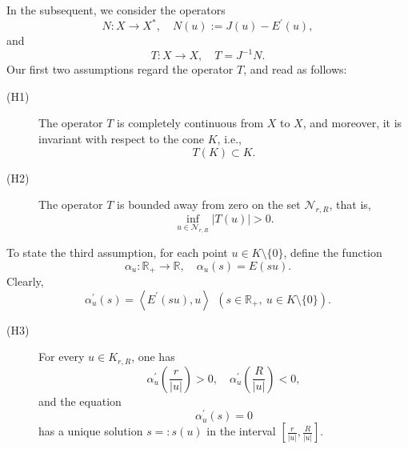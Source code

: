 \documentclass{birkjour}
\theoremstyle{definition}
\theoremstyle{remark}
\numberwithin{equation}{section}
\begin{document}
In the subsequent, we consider the operators
\begin{equation*}
N\colon X\rightarrow X^{\ast },\quad N\left( u\right) :=J\left( u\right)
-E^{\prime }(u),
\end{equation*}%
and
\begin{equation*}
T:X\rightarrow X,\quad T=J^{-1}N.
\end{equation*}%
Our first two assumptions regard the operator $T$, and read as follows:

\begin{description}
\item[(H1)] The operator $T$ is completely continuous from $X$ to $X$, and
moreover, it is invariant with respect to the cone $K$, i.e.,
\begin{equation*}
T(K)\subset K.
\end{equation*}

\item[(H2)] The operator $T$ is bounded away from zero on the set $\mathcal{N%
}_{r,R}$, that is,
\begin{equation*}
\inf_{u\in \mathcal{N}_{r,R}}\left\vert T(u)\right\vert >0.
\end{equation*}
\end{description}

To state the third assumption, for each point $u\in K\setminus \{0\}$,
define the function
\begin{equation}
\alpha _{u}\colon \mathbb{R}_{+}\rightarrow \mathbb{R},\quad \alpha
_{u}(s )=E(s u).  \label{alpha}
\end{equation}%
Clearly,%
\begin{equation*}
\alpha _{u}^{\prime }\left(s \right) =\left\langle E^{\prime }\left(
s u\right) ,u\right\rangle \ \ \left( s \in
\mathbb{R}
_{+},\ u\in K\setminus \{0\}\right) .
\end{equation*}

\begin{description}
\item[(H3)] For every $u\in K_{r,R}$, one has
\begin{equation*}
\alpha _{u}^{\prime }\left( \frac{r}{|u|}\right) >0,\quad \alpha
_{u}^{\prime }\left( \frac{R}{|u|}\right) <0,
\end{equation*}%
and the equation
\begin{equation*}
\alpha _{u}^{\prime }(s )=0
\end{equation*}%
has a unique solution $s=:s(u)$ in the interval $\left[ \frac{r}{|u|},%
\frac{R}{|u|}\right] $.
\end{description}
\end{document}
